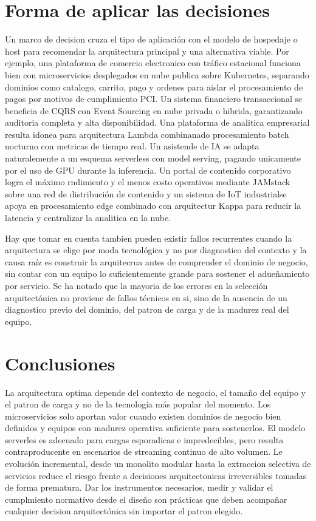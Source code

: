 \documentclass[
	article,			%
	11pt,				%
	oneside,			%
	a4paper,			%
	english,			%
	brazil,				%
	sumario=tradicional
	]{abntex2}
\begin{document}
\section{Forma de aplicar las decisiones}
Un marco de decision cruza el tipo de aplicación con el modelo de hospedaje o host para recomendar la arquitectura principal y una alternativa viable.  Por ejemplo, una plataforma de comercio electronico con tráfico estacional funciona bien con microservicios desplegados en nube publica sobre Kubernetes, separando dominios como catalogo, carrito, pago y ordenes para aislar el procesamiento de pagos por motivos de cumplimiento PCI. Un sistema financiero transaccional se beneficia de CQRS con Event Sourcing en nube privada o hibrida, garantizando auditoria completa y alta disponibilidad.  Una plataforma de analitica empresarial resulta idonea para arquitectura Lambda combinanado procesamiento batch nocturno con metricas de tiempo real.  Un asistende de IA se adapta naturalemente a un esquema serverless con model serving, pagando unicamente por el uso de GPU durante la inferencia.  Un portal de contenido corporativo logra el máximo rndimiento y el menos costo operativos mediante JAMstack sobre una red de distribución de contenido y un sistema de IoT industrialse apoya en procesamiento edge combinado con arquitectur Kappa para reducir la latencia y centralizar la analitica en la nube.

Hay que tomar en cuenta tambien pueden existir fallos recurrentes cuando la arquitectura se elige por moda tecnológica y no por diagnostico del contexto y la causa raíz es construir la arquitecrua antes de comprender el dominio de negocio, sin contar con un equipo lo suficientemente grande para sostener el adueñamiento por servicio.
Se ha notado que la mayoria de los errores en la selección arquitectónica no proviene de fallos técnicos en si, sino de la ausencia de un diagnostico previo del dominio, del patron de carga y de la madurez real del equipo.


\section{Conclusiones}
La arquitectura optima depende del contexto de negocio, el tamaño del equipo y el patron de carga y no de la tecnología más popular del momento.
Los microservicios solo aportan valor cuando existen dominios de negocio bien definidos y equipos con madurez operativa suficiente para sostenerlos.
El modelo serverles es adecuado para cargas esporadicas e impredecibles, pero resulta contraproducente en escenarios de streaming continuo de alto volumen.
Le evolución incremental, desde un monolito modular hasta la extraccion selectiva de servicios reduce el riesgo frente a decisiones arquitectonicas irreversibles tomadas de forma prematura.
Dar los instrumentos necesarios, medir y validar el cumplmiento normativo desde el diseño son prácticas que deben acompañar cualquier decision arquitectónica sin importar el patron elegido.
\end{document}
